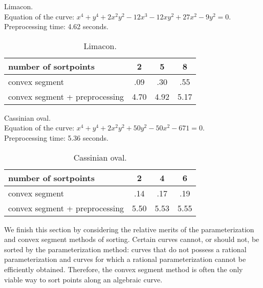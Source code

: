 \begin{example}
\label{eg-limacon}
{\samepage
Limacon.\\
\indent Equation of the curve: $x^{4} + y^{4} + 2x^{2}y^{2} - 12x^{3} - 12xy^{2} + 
	27x^{2} - 9y^{2} = 0$.\\
\indent Preprocessing time: 4.62 seconds.

}
\begin{table}[htbp]
\caption{Limacon.}
\begin{center}
\begin{tabular}{|l|c|c|c|} \hline
number of sortpoints & 2 & 5 & 8 \\ \hline \hline
convex segment & .09 & .30 & .55 \\ \hline
convex segment + preprocessing & 4.70 & 4.92 & 5.17 \\ \hline
\end{tabular}
\end{center}
\end{table}
\end{example}

\begin{example}
\label{eg-Cassinian}
{\samepage
Cassinian oval.\\
\indent Equation of the curve: $x^{4} + y^{4} + 2x^{2}y^{2} + 50y^{2} - 50x^{2}-671 = 0$.\\
\indent Preprocessing time: 5.36 seconds.

}
\begin{table}[htbp]
\caption{Cassinian oval.}
\begin{center}
\begin{tabular}{|l|c|c|c|} \hline
number of sortpoints & 2 & 4 & 6 \\ \hline \hline
convex segment & .14 & .17 & .19 \\ \hline
convex segment + preprocessing & 5.50 & 5.53 & 5.55 \\ \hline
\end{tabular}
\end{center}
\end{table}
\end{example}

\vspace{.2in}

We finish this section by considering the relative merits of the parameterization and 
convex segment methods of sorting.
Certain curves cannot, or should 
not, be sorted by the parameterization method: curves that 
do not possess a rational parameterization and curves for which
a rational parameterization cannot be efficiently obtained.
Therefore, the convex segment method is often 
the only viable way to sort points along an algebraic curve.

